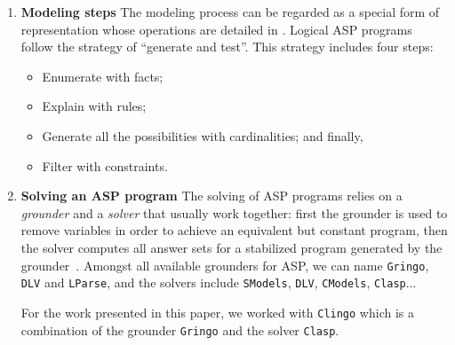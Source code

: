 \begin{enumerate}
\item\textbf{Modeling steps}
The modeling process can be regarded as a special form of representation whose operations are detailed in \cite{baral2003knowledge}.
Logical ASP programs follow the strategy of “generate and test”.
This strategy includes four steps:
\begin{itemize}
\item Enumerate with facts;
\item Explain with rules;
\item Generate all the possibilities with cardinalities; and finally,
\item Filter with constraints.
\end{itemize}

\item \textbf{Solving an ASP program}
The solving of ASP programs relies on a \emph{grounder} and a \emph{solver}
that usually work together:
first the grounder is used to remove variables in order to achieve an equivalent but constant program,
then the solver computes all answer sets for a stabilized program generated by the grounder~\cite{Vladimir,AnsPrologAPE}.
Amongst all available grounders for ASP, we can name
\texttt{Gringo}, \texttt{DLV} and \texttt{LParse},
and the solvers include
\texttt{SModels}, \texttt{DLV}, \texttt{CModels}, \texttt{Clasp}...

For the work presented in this paper, we worked with \texttt{Clingo} which is a combination of the grounder \texttt{Gringo} and the solver \texttt{Clasp}.

\end{enumerate}

